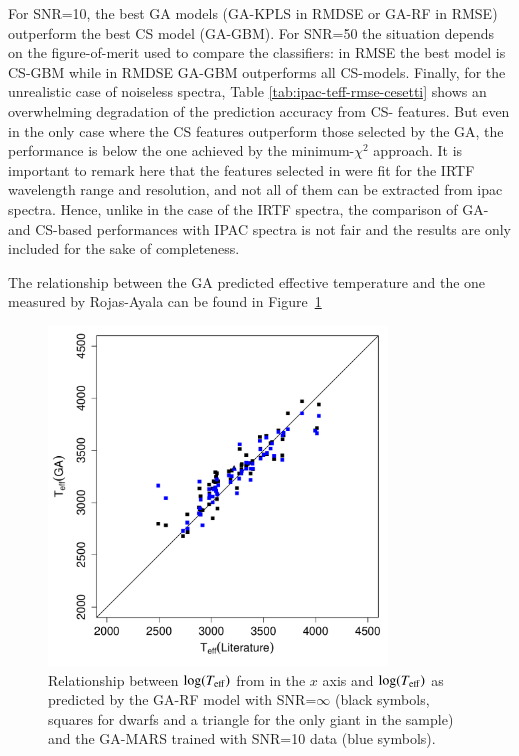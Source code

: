 For SNR=10, the best GA models (GA-KPLS in RMDSE or GA-RF in RMSE)
outperform the best CS model (GA-GBM). For SNR=50 the situation
depends on the figure-of-merit used to compare the classifiers: in
RMSE the best model is CS-GBM while in RMDSE GA-GBM outperforms all
CS-models. Finally, for the unrealistic case of noiseless spectra,
Table \ref{tab:ipac-teff-rmse-cesetti} shows an overwhelming
degradation of the prediction accuracy from CS- features. But even in
the only case where the CS features outperform those selected by the
GA, the performance is below the one achieved by the minimum-$\chi^2$
approach. It is important to remark here that the features selected
in \cite{cesetti} were fit for the IRTF wavelength range and
resolution, and not all of them can be extracted from ipac
spectra. Hence, unlike in the case of the IRTF spectra, the comparison
of GA- and CS-based performances with IPAC spectra is not fair and
the results are only included for the sake of completeness.

The relationship between the GA predicted effective temperature and
the one measured by Rojas-Ayala can be found in
Figure~\ref{fig:ipac_lt_lt}

\begin{figure}
 \begin{center} \includegraphics[width=9cm]{figs/ipac_LG_Trojas_Tknn_10.pdf}

\caption{Relationship
 between $\log(T_{\rm eff})$ from \protect\cite{RA2012} in the $x$ axis and
 $\log(T_{\rm eff})$ as predicted by the GA-RF model with SNR=$\infty$
 (black symbols, squares for dwarfs and a triangle for the only giant
 in the sample) and the GA-MARS trained with SNR=10 data (blue
 symbols).} \label{fig:ipac_lt_lt} \end{center}
\end{figure}

